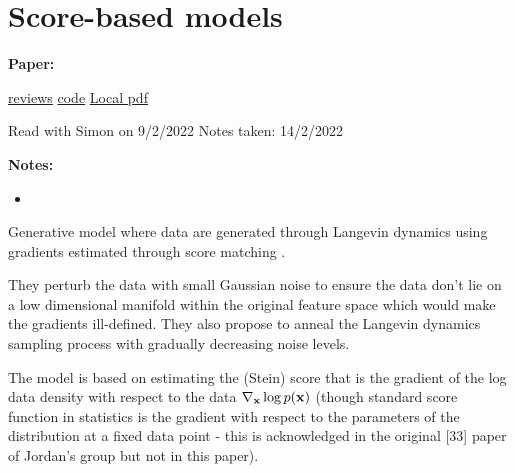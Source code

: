 \clearpage

\section{Score-based models}\label{sec:scorebased}

\begin{notebox}
\textbf{Paper: } 
\vspace{5pt}

\href{https://papers.nips.cc/paper/2019/file/3001ef257407d5a371a96dcd947c7d93-Reviews.html}{reviews}
\hspace{1cm}
\href{https://github.com/yang-song/score_sde_pytorch}{code}
\hspace{1cm}
\href{run:/home/magda/Dropbox/Zot/Song_Ermon_2020_Generative Modeling by Estimating Gradients of the Data Distribution.pdf}{Local pdf}
\vspace{3pt}

Read with Simon on 9/2/2022
\hfill Notes taken: 14/2/2022 
\end{notebox}

\begin{notebox}[colback=red!5]
\tldr 
\end{notebox}

\begin{notebox}[colback=yellow!5]
\textbf{Notes:} 
\begin{itemize}[nosep]
\item 
\end{itemize}
\end{notebox}


Generative model where data are generated through Langevin dynamics \parencite{welling_bayesian_nodate} using gradients estimated through score matching \parencite{hyvarinen_estimation_nodate}.

They perturb the data with small Gaussian noise to ensure the data don't lie on a low dimensional manifold within the original feature space which would make the gradients ill-defined. They also propose to anneal the Langevin dynamics sampling process with gradually decreasing noise levels.

The model is based on estimating the (Stein) score that is the gradient of the log data density with respect to the data $\nabla_{{\mathbf{x}}} \log p({\mathbf{x}})$ (though standard score function in statistics is the gradient with respect to the parameters of the distribution at a fixed data point - this is acknowledged in the original [33] paper of Jordan's group but not in this paper).

